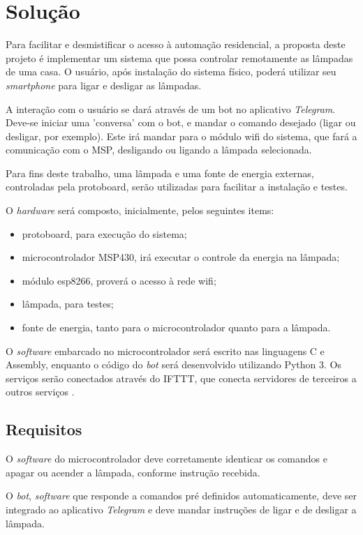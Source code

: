 \documentclass[12pt,journal,compsoc]{IEEEtran}
\begin{document}
\section{Solução}

Para facilitar e desmistificar o acesso à automação residencial, a proposta deste projeto é implementar um sistema que possa controlar remotamente as lâmpadas de uma casa. O usuário, após instalação do sistema físico, poderá utilizar seu \emph{smartphone} para ligar e desligar as lâmpadas.

A interação com o usuário se dará através de um bot no aplicativo \emph{Telegram}. Deve-se iniciar uma 'conversa' com o bot, e mandar o comando desejado (ligar ou desligar, por exemplo). Este irá mandar para o módulo wifi do sistema, que fará a comunicação com o MSP, desligando ou ligando a lâmpada selecionada.

Para fins deste trabalho, uma lâmpada e uma fonte de energia externas, controladas pela protoboard, serão utilizadas para facilitar a instalação e testes.

O \textit{hardware} será composto, inicialmente, pelos seguintes items:

\begin{itemize}
\item protoboard, para execução do sistema;
\item microcontrolador MSP430, irá executar o controle da energia na lâmpada;
\item módulo esp8266, proverá o acesso à rede wifi;
\item lâmpada, para testes;
\item fonte de energia, tanto para o microcontrolador quanto para a lâmpada.
\end{itemize}

O \textit{software} embarcado no microcontrolador será escrito nas linguagens C e Assembly, enquanto o código do \textit{bot} será desenvolvido utilizando Python 3. Os serviços serão conectados através do IFTTT, que conecta servidores de terceiros a outros serviços \cite{ovadia2014automate}.

\subsection{Requisitos}

O \textit{software} do microcontrolador deve corretamente identicar os comandos e apagar ou acender a lâmpada, conforme instrução recebida.

O \emph{bot}, \textit{software} que responde a comandos pré definidos automaticamente, deve ser integrado ao aplicativo \textit{Telegram} e deve mandar instruções de ligar e de desligar a lâmpada.
\end{document}
